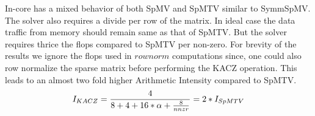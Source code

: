 In-core has a mixed behavior of both SpMV and SpMTV similar to SymmSpMV. The solver also requires a divide per  row of the matrix. In ideal case the data traffic from memory should remain same as that of SpMTV. But the solver requires thrice the flops compared to SpMTV per non-zero. For brevity of the results we ignore the flops used in $rownorm$ computations since, one could also row normalize the sparse matrix before performing the KACZ operation. This leads to an almost two fold higher Arithmetic Intensity compared to SpMTV.
\begin{equation}
\label{eq:KACZ_intensity}
I_{KACZ} =  \frac{4}{8+4+16*\alpha+\frac{8}{nnzr}} = 2*I_{SpMTV}\\
\end{equation}
